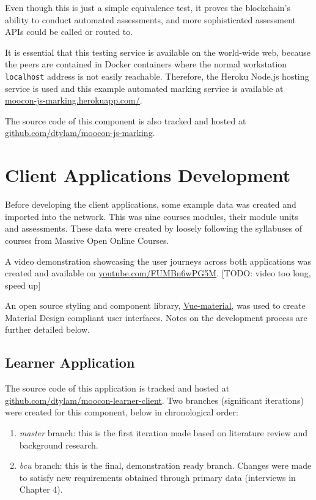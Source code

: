Even though this is just a simple equivalence test, it proves the blockchain's ability to conduct automated assessments, 
and more sophisticated assessment APIs could be called or routed to.

It is essential that this testing service is available on the world-wide web, because the peers are contained in Docker
containers where the normal workstation \texttt{localhost} address is not easily reachable. Therefore, the Heroku Node.js 
hosting service is used and this example automated marking service is available at 
\href{https://moocon-js-marking.herokuapp.com/}{\underline{moocon-js-marking.herokuapp.com/}}.

The source code of this component is also tracked and hosted at 
\href{https://github.com/dtylam/moocon-js-marking}{\underline{github.com/dtylam/moocon-js-marking}}.

\section{Client Applications Development}

Before developing the client applications, some example data was created and imported into the network. 
This was nine courses modules, their module units and assessments. These data were created by loosely following 
the syllabuses of courses from Massive Open Online Courses.

A video demonstration showcasing the user journeys across both applications was created and 
available on \href{https://youtu.be/FUMBn6wPG5M}{\underline{youtube.com/FUMBn6wPG5M}}. [TODO: video too long, speed up]

An open source styling and component library, \href{https://vuematerial.io/}{Vue-material}, was used to 
create Material Design compliant user interfaces. Notes on the development process are further detailed below.

\subsection{Learner Application}

The source code of this application is tracked and hosted at 
\href{https://github.com/dtylam/moocon-learner-client}{\underline{github.com/dtylam/moocon-learner-client}}.
Two branches (significant iterations) were created for this component, below in chronological order:
\begin{enumerate}
	\setlength\itemsep{0em}
	\item \textit{master} branch: this is the first iteration made based on literature review and background research.
	\item \textit{bcu} branch: this is the final, demonstration ready branch. 
	Changes were made to satisfy new requirements obtained through primary data (interviews in Chapter 4).
\end{enumerate}

